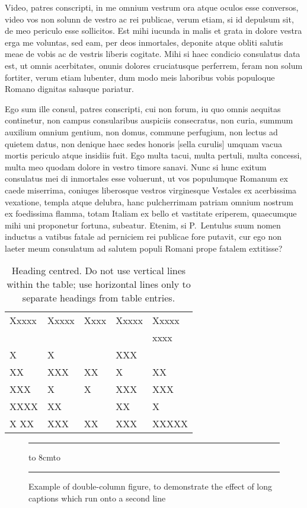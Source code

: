 \documentclass[letterpaper]{ifacmtg}
\begin{document}
Video, patres conscripti, in me omnium vestrum ora atque oculos esse
conversos, video vos non solunn de vestro ac rei publicae, verum etiam,
si id depulsum sit, de meo periculo esse sollicitos. Est mihi iucunda in
malis et grata in dolore vestra erga me voluntas, sed eam, per deos
inmortales, deponite atque obliti salutis meae de vobis ac de vestris
liberis cogitate. Mihi si haec condicio consulatus data est, ut omnis
acerbitates, onunis dolores cruciatusque perferrem, feram non solum
fortiter, verum etiam lubenter, dum modo meis laboribus vobis populoque
Romano dignitas salusque pariatur. \par Ego sum ille consul, patres
conscripti, cui non forum, iu quo omnis aequitas continetur, non campus
consularibus auspiciis consecratus, non curia, summum auxilium omnium
gentium, non domus, commune perfugium, non lectus ad quietem datus, non
denique haec sedes honoris [sella curulis] umquam vacua mortis periculo
atque insidiis fuit.  Ego multa tacui, multa pertuli, multa concessi,
multa meo quodam dolore in vestro timore sanavi. Nunc si hunc exitum
consulatus mei di inmortales esse voluerunt, ut vos populumque Romanum
ex caede miserrima, coniuges liberosque vestros virginesque Vestales ex
acerbissima vexatione, templa atque delubra, hanc pulcherrimam patriam
omnium nostrum ex foedissima flamma, totam Italiam ex bello et vastitate
eriperem, quaecumque mihi uni proponetur fortuna, subeatur. Etenim, si
P.~Lentulus suum nomen inductus a vatibus fatale ad perniciem rei
publicae fore putavit, cur ego non laeter meum consulatum ad salutem
populi Romani prope fatalem extitisse?

\begin{table}[htbp]
  \caption{Heading centred. Do not use vertical lines within the
    table; use horizontal lines only to separate headings from table
    entries.}
  \label{tab:1}
  \begin{tabular*}{\hsize}{lllll}
\hline
Xxxxx & Xxxxx & Xxxx & Xxxxx & Xxxxx \\
      &       &      &       & xxxx  \\
\hline
X     & X     &      & XXX   &       \\
XX    & XXX   & XX   & X     & XX    \\
XXX   & X     & X    & XXX   & XXX   \\
XXXX  & XX    &      & XX    & X     \\
X XX  & XXX   & XX   & XXX   & XXXXX \\
\hline
  \end{tabular*}
\end{table}
\begin{figure*}
\hrule
\vbox to 8cm{\vfill \hbox to \vfill}
\hrule
\caption{Example of double-column figure, to demonstrate the effect of
  long captions which run onto a second line}
\label{song}
\end{figure*}
\end{document}
